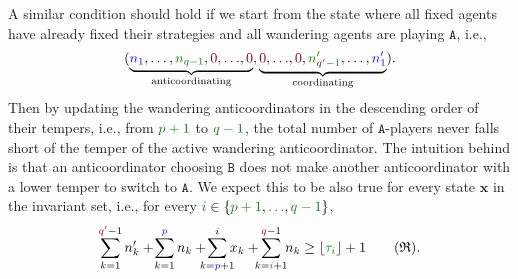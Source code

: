 \documentclass[10 pt,twocolumn,journal]{IEEEtran}
\DeclarePairedDelimiter{\floor}{\lfloor}{\rfloor}
\theoremstyle{plain}
\newcommand{\A}{\mathcal{A}}
\newcommand{\x}{\bm{x}}
\newcommand{\p}{\tb{p}}
\newcommand{\q}{\tr{q}}
\newcommand{\qq}{\tr{q'}}
\renewcommand{\A}{\mathtt{A}}
\newcommand{\B}{\mathtt{B}}
\newcommand{\tb}{\textcolor{blue}}
\newcommand{\tr}{\textcolor{Myred}}
\newcommand{\tg}{\textcolor{Mygreen}}
\theoremstyle{definition}
\begin{document}
A similar condition should hold if we start from the state where all fixed agents have already fixed their strategies and all wandering agents are playing $\A$, i.e., 
\begin{equation*}
    (\underbrace{\tb{n_1},\ldots,\tg{n_{q-1}},\tr{0},\tr{\ldots},\tr{0}}_{\text{anticoordinating}}, 
    \underbrace{\tr{0},\tr{\ldots},\tr{0}, \tg{n'_{\qq -1}}, \ldots, \tb{n'_1}}_{\text{coordinating}}).
\end{equation*}
Then by updating the wandering anticoordinators in the descending order of their tempers, i.e., from $\tg{p+1}$ to $\tg{q-1}$, the total number of $\A$-players never falls short of the temper of the active wandering anticoordinator. 
The intuition behind is that an anticoordinator choosing $\B$ does not make another anticoordinator with a lower temper to switch to $\A$.
We expect this to be also true for every state $\x$ in the invariant set, i.e., for every $\tg{i}\in\{\tg{p+1},\tg{\ldots},\tg{q-1}\}$,
\begin{equation*}
    \sum_{k=1}^{\qq-1} n'_k +\! \sum_{k=1}^{\p} n_k +\!\!\!\! \sum_{k=\p+1}^{i}\!\!\! x_k + \!\!\!\sum_{k=\tg{i}+1}^{\q-1}\!\! n_k
            \geq \floor{\tg{\tau_i}}+1
             \tag{$\mathfrak{R}$}.\label{R}
\end{equation*}
\end{document}
